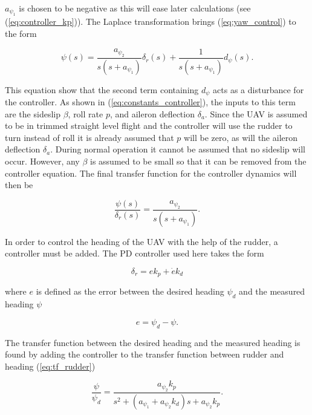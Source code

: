 $a_{\psi_1}$ is chosen to be negative as this will ease later calculations (see (\ref{eq:controller_kp})). The Laplace transformation brings (\ref{eq:yaw_control}) to the form

\begin{equation}
	\label{eq:yaw_controller_s}
	\psi(s) = \frac{a_{\psi_2}}{s(s+a_{\psi_1})}\delta_r(s) + \frac{1}{s(s+a_{\psi_1})}d_\psi(s).
\end{equation}

This equation show that the second term containing $d_\psi$ acts as a disturbance for the controller. As shown in (\ref{eq:constants_controller}), the inputs to this term are the sideslip $\beta$, roll rate $p$, and aileron deflection $\delta_a$. Since the UAV is assumed to be in trimmed straight level flight and the controller will use the rudder to turn instead of roll it is already assumed that $p$ will be zero, as will the aileron deflection $\delta_a$. During normal operation it cannot be assumed that no sideslip will occur. However, any $\beta$ is assumed to be small so that it can be removed from the controller equation. The final transfer function for the controller dynamics will then be

\begin{equation}
	\label{eq:tf_rudder}
	\frac{\psi(s)}{\delta_r(s)} = \frac{a_{\psi_2}}{s(s+a_{\psi_1})}.
\end{equation}

In order to control the heading of the UAV with the help of the rudder, a controller must be added. The PD controller used here takes the form

\begin{equation}
	\delta_r = ek_p + \dot{e}k_d
\end{equation}

where $e$ is defined as the error between the desired heading $\psi_d$ and the measured heading $\psi$

\begin{equation}
	e = \psi_d - \psi.
\end{equation}

The transfer function between the desired heading and the measured heading is found by adding the controller to the transfer function between rudder and heading (\ref{eq:tf_rudder})

\begin{equation}
	\label{eq:rudder_PD}
	\frac{\psi}{\psi_d} = \frac{a_{\psi_2}k_p}{s^2 + (a_{\psi_1}+a_{\psi_2}k_d)s + a_{\psi_2}k_p}.
\end{equation}

